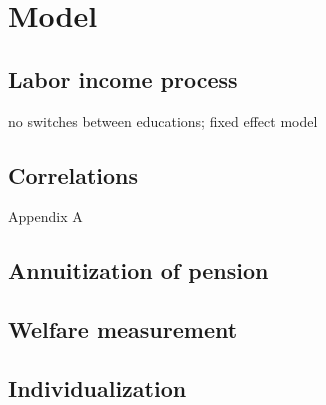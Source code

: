 \chapter{Model}
\label{model}

\section{Labor income process}
no switches between educations; fixed effect model
\section{Correlations}
Appendix A
\section{Annuitization of pension}
\section{Welfare measurement}
\section{Individualization}
